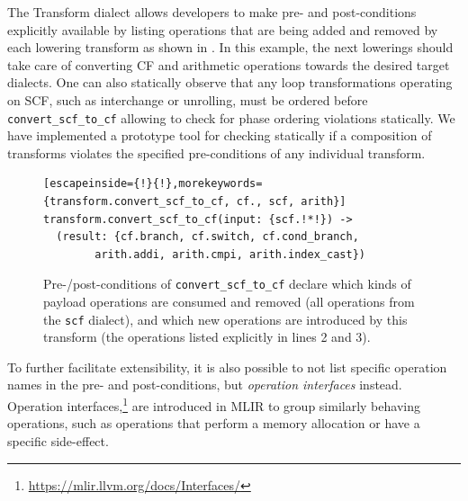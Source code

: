 \documentclass[screen,nonacm,authorversion]{acmart}
\newcommand{\margincomment}[1]{#1}
\newcommand{\margincomment}[1]{}
\newcommand{\az}[1]{\margincomment{\marginpar{\color{brown}\small\textbf{Alex:} #1}}}
\newcommand{\ms}[1]{\margincomment{\marginpar{\color{orange}\small\textbf{Michel:} #1}}}
\begin{document}
The Transform dialect allows developers to make pre- and post-conditions explicitly available by listing operations that are being added and removed by each lowering transform as shown in . In this example, the next lowerings should take care of converting CF and arithmetic operations towards the desired target dialects. One can also statically observe that any loop transformations operating on SCF, such as interchange or unrolling, must be ordered before \texttt{convert\_scf\_to\_cf} allowing to check for phase ordering violations statically.
We have implemented a prototype tool for checking statically if a composition of transforms violates the specified pre-conditions of any individual transform.



\begin{figure}[t]
\centering
\begin{lstlisting}[escapeinside={!}{!},morekeywords={transform.convert_scf_to_cf, cf., scf, arith}]
transform.convert_scf_to_cf(input: {scf.!*!}) ->
  (result: {cf.branch, cf.switch, cf.cond_branch,
        arith.addi, arith.cmpi, arith.index_cast})
\end{lstlisting}
\caption{Pre-/post-conditions of \texttt{convert\_scf\_to\_cf} declare which kinds of payload operations are consumed and removed (all operations from the \texttt{scf} dialect), and which new operations are introduced by this transform (the operations listed explicitly in lines 2 and 3).}
\label{fig:scf_to_cf_constraints}
\end{figure}

To further facilitate extensibility, it is also possible to not list specific operation names in the pre- and post-conditions, but \emph{operation interfaces} instead.
Operation interfaces,\footnote{\url{https://mlir.llvm.org/docs/Interfaces/}} are introduced in MLIR to group similarly behaving operations, such as operations that perform a memory allocation or have a specific side-effect.

\end{document}
